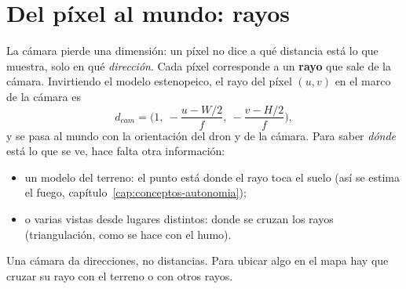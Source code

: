 \section{Del píxel al mundo: rayos}

La cámara pierde una dimensión: un píxel no dice a qué distancia está lo que muestra, solo en qué
\emph{dirección}. Cada píxel corresponde a un \textbf{rayo} que sale de la cámara. Invirtiendo el
modelo estenopeico, el rayo del píxel $(u,v)$ en el marco de la cámara es
\begin{equation}
d_{cam} = \Big(1,\ -\frac{u - W/2}{f},\ -\frac{v - H/2}{f}\Big),
\end{equation}
y se pasa al mundo con la orientación del dron y de la cámara. Para saber \emph{dónde} está lo que se
ve, hace falta otra información:
\begin{itemize}
  \item un modelo del terreno: el punto está donde el rayo toca el suelo (así se estima el fuego,
        capítulo~\ref{cap:conceptos-autonomia});
  \item o varias vistas desde lugares distintos: donde se cruzan los rayos (triangulación, como se
        hace con el humo).
\end{itemize}

\begin{recuerda}
Una cámara da direcciones, no distancias. Para ubicar algo en el mapa hay que cruzar su rayo con el
terreno o con otros rayos.
\end{recuerda}
